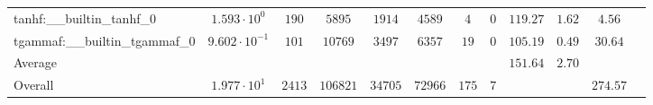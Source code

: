 \begin{tabular}{|l|c|c|c|c|c|c|c|c|c|c|c|}
tanhf:\_\_builtin\_tanhf\_0               & $ 1.593 \cdot 10^{0}  $ & $ 190    $ & $ 5895   $ & $ 1914  $ & $ 4589  $ & $ 4   $ & $ 0 $ & $ 119.27      $ & $ 1.62    $ & $ 4.56    $ \\
tgammaf:\_\_builtin\_tgammaf\_0           & $ 9.602 \cdot 10^{-1} $ & $ 101    $ & $ 10769  $ & $ 3497  $ & $ 6357  $ & $ 19  $ & $ 0 $ & $ 105.19      $ & $ 0.49    $ & $ 30.64   $ \\
\hline
Average                                   & $                     $ & $        $ & $        $ & $       $ & $       $ & $     $ & $   $ & $ 151.64      $ & $ 2.70    $ & $         $ \\
\hline
Overall                                   & $ 1.977 \cdot 10^{1}  $ & $ 2413   $ & $ 106821 $ & $ 34705 $ & $ 72966 $ & $ 175 $ & $ 7 $ & $             $ & $         $ & $ 274.57  $ \\
\hline
\end{tabular}
